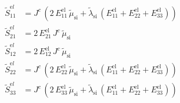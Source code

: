 \begin{align}
\tilde{S}^{\mathrm el}_{11} &= J^{c}\,\left(2\,E_{11}^{\mathrm{el}}\,\tilde{\mu }_{\mathrm{si}}+\tilde{\lambda }_{\mathrm{si}}\,\left(E_{11}^{\mathrm{el}}+E_{22}^{\mathrm{el}}+E_{33}^{\mathrm{el}}\right)\right) \\ 
\tilde{S}^{\mathrm el}_{21} &= 2\,E_{21}^{\mathrm{el}}\,J^{c}\,\tilde{\mu }_{\mathrm{si}} \\ 
\tilde{S}^{\mathrm el}_{12} &= 2\,E_{12}^{\mathrm{el}}\,J^{c}\,\tilde{\mu }_{\mathrm{si}} \\ 
\tilde{S}^{\mathrm el}_{22} &= J^{c}\,\left(2\,E_{22}^{\mathrm{el}}\,\tilde{\mu }_{\mathrm{si}}+\tilde{\lambda }_{\mathrm{si}}\,\left(E_{11}^{\mathrm{el}}+E_{22}^{\mathrm{el}}+E_{33}^{\mathrm{el}}\right)\right) \\ 
\tilde{S}^{\mathrm el}_{33} &= J^{c}\,\left(2\,E_{33}^{\mathrm{el}}\,\tilde{\mu }_{\mathrm{si}}+\tilde{\lambda }_{\mathrm{si}}\,\left(E_{11}^{\mathrm{el}}+E_{22}^{\mathrm{el}}+E_{33}^{\mathrm{el}}\right)\right) 
\end{align}
